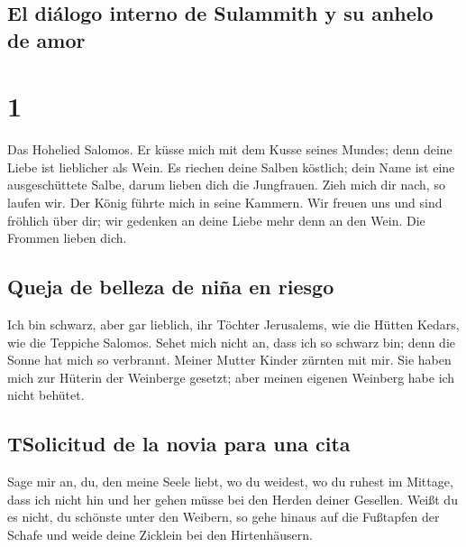 \hypertarget{el-diuxe1logo-interno-de-sulammith-y-su-anhelo-de-amor}{%
\subsection{El diálogo interno de Sulammith y su anhelo de
amor}\label{el-diuxe1logo-interno-de-sulammith-y-su-anhelo-de-amor}}

\hypertarget{section}{%
\section{1}\label{section}}

 Das Hohelied Salomos.  Er küsse mich mit
dem Kusse seines Mundes; denn deine Liebe ist lieblicher als Wein.
 Es riechen deine Salben köstlich; dein Name ist eine
ausgeschüttete Salbe, darum lieben dich die Jungfrauen. 
Zieh mich dir nach, so laufen wir. Der König führte mich in seine
Kammern. Wir freuen uns und sind fröhlich über dir; wir gedenken an
deine Liebe mehr denn an den Wein. Die Frommen lieben dich.

\hypertarget{queja-de-belleza-de-niuxf1a-en-riesgo}{%
\subsection{Queja de belleza de niña en
riesgo}\label{queja-de-belleza-de-niuxf1a-en-riesgo}}

 Ich bin schwarz, aber gar lieblich, ihr Töchter
Jerusalems, wie die Hütten Kedars, wie die Teppiche Salomos.
 Sehet mich nicht an, dass ich so schwarz bin; denn die
Sonne hat mich so verbrannt. Meiner Mutter Kinder zürnten mit mir. Sie
haben mich zur Hüterin der Weinberge gesetzt; aber meinen eigenen
Weinberg habe ich nicht behütet.

\hypertarget{tsolicitud-de-la-novia-para-una-cita}{%
\subsection{TSolicitud de la novia para una
cita}\label{tsolicitud-de-la-novia-para-una-cita}}

 Sage mir an, du, den meine Seele liebt, wo du weidest, wo
du ruhest im Mittage, dass ich nicht hin und her gehen müsse bei den
Herden deiner Gesellen.  Weißt du es nicht, du schönste
unter den Weibern, so gehe hinaus auf die Fußtapfen der Schafe und weide
deine Zicklein bei den Hirtenhäusern.

